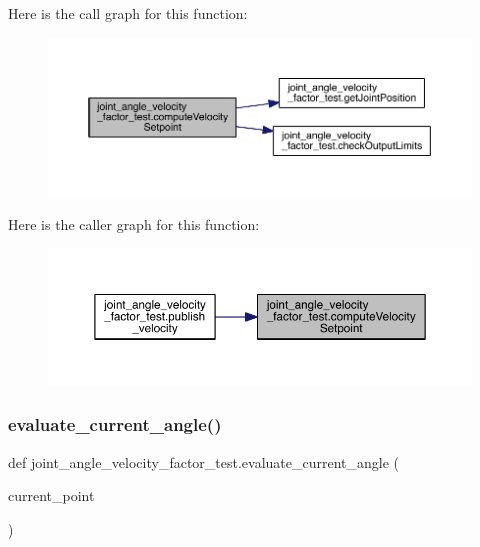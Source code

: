 Here is the call graph for this function\+:\nopagebreak
\begin{figure}[H]
\begin{center}
\leavevmode
\includegraphics[width=350pt]{namespacejoint__angle__velocity__factor__test_a26a2f9375796bb26ff0160fd97507015_cgraph}
\end{center}
\end{figure}
Here is the caller graph for this function\+:\nopagebreak
\begin{figure}[H]
\begin{center}
\leavevmode
\includegraphics[width=350pt]{namespacejoint__angle__velocity__factor__test_a26a2f9375796bb26ff0160fd97507015_icgraph}
\end{center}
\end{figure}
\mbox{\label{namespacejoint__angle__velocity__factor__test_a5477dfc158501561a43ab3b829e0ad12}} 
\subsubsection{\texorpdfstring{evaluate\_current\_angle()}{evaluate\_current\_angle()}}
{\footnotesize\ttfamily def joint\+\_\+angle\+\_\+velocity\+\_\+factor\+\_\+test.\+evaluate\+\_\+current\+\_\+angle (\begin{DoxyParamCaption}\item[{}]{current\+\_\+point }\end{DoxyParamCaption})}



